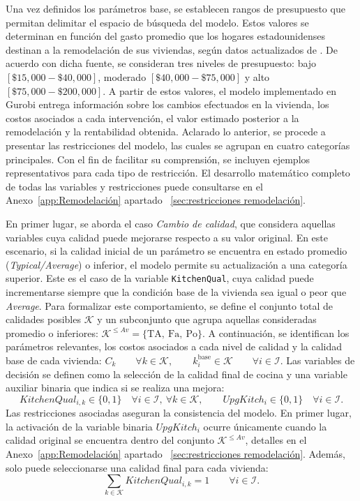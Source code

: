 Una vez definidos los parámetros base, se establecen rangos de presupuesto que permitan delimitar el espacio de búsqueda del modelo. Estos valores se determinan en función del gasto promedio que los hogares estadounidenses destinan a la remodelación de sus viviendas, según datos actualizados de \cite{Noel2025a}. De acuerdo con dicha fuente, se consideran tres niveles de presupuesto: 
bajo $[\$15{,}000 - \$40{,}000]$, 
moderado $[\$40{,}000 - \$75{,}000]$ 
y alto $[\$75{,}000 - \$200{,}000]$. 
A partir de estos valores, el modelo implementado en Gurobi entrega información sobre los cambios efectuados en la vivienda, los costos asociados a cada intervención, el valor estimado posterior a la remodelación y la rentabilidad obtenida. Aclarado lo anterior, se procede a presentar las restricciones del modelo, las cuales se agrupan en cuatro categorías principales. Con el fin de facilitar su comprensión, se incluyen ejemplos representativos para cada tipo de restricción. El desarrollo matemático completo de todas las variables y restricciones puede consultarse en el Anexo~\ref{app:Remodelación} apartado ~\ref{sec:restricciones remodelación}.

En primer lugar, se aborda el caso \textit{Cambio de calidad}, que considera aquellas variables cuya calidad puede mejorarse respecto a su valor original. En este escenario, si la calidad inicial de un parámetro se encuentra en estado promedio (\textit{Typical/Average}) o inferior, el modelo permite su actualización a una categoría superior. Este es el caso de la variable \texttt{KitchenQual}, cuya calidad puede incrementarse siempre que la condición base de la vivienda sea igual o peor que \textit{Average}. Para formalizar este comportamiento, se define el conjunto total de calidades posibles $\mathcal{K}$ y un subconjunto que agrupa aquellas consideradas promedio o inferiores:
$\mathcal{K}^{\le Av} = \{\text{TA},\ \text{Fa},\ \text{Po}\}.$
A continuación, se identifican los parámetros relevantes, los costos asociados a cada nivel de calidad y la calidad base de cada vivienda:
$C_k \qquad \forall k \in \mathcal{K},
\qquad
k_i^{\text{base}} \in \mathcal{K} \qquad \forall i \in \mathcal{I}.$
Las variables de decisión se definen como la selección de la calidad final de cocina y una variable auxiliar binaria que indica si se realiza una mejora:
\[
KitchenQual_{i,k} \in \{0,1\} \quad \forall i \in \mathcal{I},\ \forall k \in \mathcal{K},
\qquad
UpgKitch_i \in \{0,1\} \quad \forall i \in \mathcal{I}.
\]
Las restricciones asociadas aseguran la consistencia del modelo. En primer lugar, la activación de la variable binaria $UpgKitch_i$ ocurre únicamente cuando la calidad original se encuentra dentro del conjunto $\mathcal{K}^{\le Av}$, detalles en el Anexo~\ref{app:Remodelación} apartado ~\ref{sec:restricciones remodelación}. Además, solo puede seleccionarse una calidad final para cada vivienda:
\[
\sum_{k \in \mathcal{K}} KitchenQual_{i,k} = 1 \qquad \forall i \in \mathcal{I}.
\]

